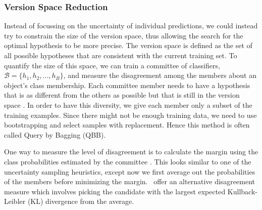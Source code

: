 \documentclass[fleqn,10pt,lineno]{wlpeerj} %
\newcommand{\B}{\mathcal{B}}
\begin{document}
\subsubsection*{Version Space Reduction}

Instead of focussing on the uncertainty of individual predictions, we could
instead try to constrain the size of the version space, thus allowing the
search for the optimal hypothesis to be more precise. The version space is
defined as the set of all possible hypotheses that are consistent with the
current training set. To quantify the size of this space, we can train a
committee of classifiers, $\B = \{h_1, h_2, ..., h_B\}$, and measure the
disagreement among the members about an object's class membership. Each
committee member needs to have a hypothesis that is as different from the
others as possible but that is still in the version space \citep{melville04}.
In order to have this diversity, we give each member only a subset of the
training examples. Since there might not be enough training data, we need to
use bootstrapping and select samples with replacement. Hence this method is
often called Query by Bagging (QBB).

One way to measure the level of disagreement is to calculate the margin using
the class probabilities estimated by the committee \citep{melville04}. This
looks similar to one of the uncertainty sampling heuristics, except now we
first average out the probabilities of the members before minimizing the
margin.~\cite{mccallum98} offer an alternative disagreement measure which
involves picking the candidate with the largest expected Kullback-Leibler (KL)
divergence from the average.
\end{document}
